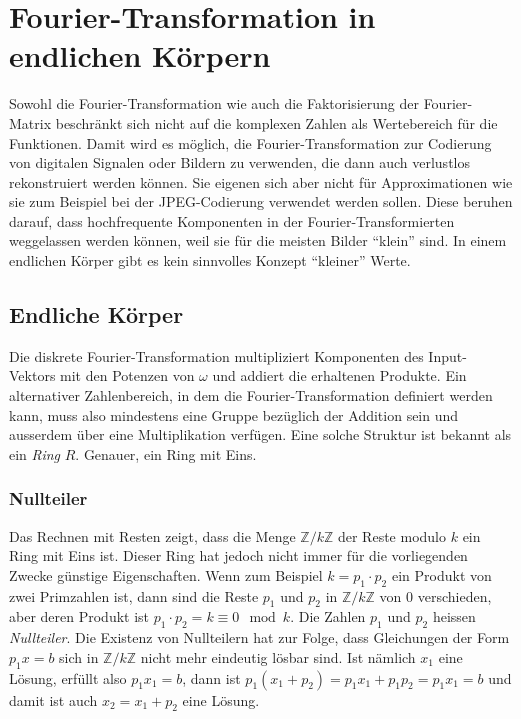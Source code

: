 %
%
%
\section{Fourier-Transformation in endlichen Körpern
\label{buch:diskret:section:koerper}}
Sowohl die Fourier-Transformation wie auch die Faktorisierung
der Fourier-Matrix beschränkt sich nicht auf die komplexen Zahlen
als Wertebereich für die Funktionen.
Damit wird es möglich, die Fourier-Transformation zur Codierung von
digitalen Signalen oder Bildern zu verwenden, die dann auch verlustlos
rekonstruiert werden können.
Sie eigenen sich aber nicht für Approximationen wie sie zum Beispiel
bei der JPEG-Codierung verwendet werden sollen.
Diese beruhen darauf, dass hochfrequente Komponenten in der
Fourier-Transformierten weggelassen werden können, weil sie für die
meisten Bilder ``klein'' sind.
In einem endlichen Körper gibt es kein sinnvolles Konzept ``kleiner''
Werte.

%
%
\subsection{Endliche Körper
\label{buch:diskret:koerper:subsection:koerper}}
Die diskrete Fourier-Transformation multipliziert Komponenten des
Input-Vektors mit den Potenzen von $\omega$ und addiert die erhaltenen
Produkte.
Ein alternativer Zahlenbereich, in dem die Fourier-Transformation
definiert werden kann, muss also mindestens eine Gruppe bezüglich 
der Addition sein und ausserdem über eine Multiplikation verfügen.
Eine solche Struktur ist bekannt als ein {\em Ring} $R$.
Genauer, ein Ring mit Eins.

%
%
\subsubsection{Nullteiler}
Das Rechnen mit Resten zeigt, dass die Menge $\mathbb{Z}/k\mathbb{Z}$
der Reste modulo $k$ ein Ring mit Eins ist.
Dieser Ring hat jedoch nicht immer für die vorliegenden Zwecke günstige
Eigenschaften.
Wenn zum Beispiel $k=p_1\cdot p_2$ ein Produkt von zwei Primzahlen
ist, dann sind die Reste $p_1$ und $p_2$ in $\mathbb{Z}/k\mathbb{Z}$
von $0$ verschieden, aber deren Produkt ist
$p_1\cdot p_2 = k \equiv 0 \mod k$.
Die Zahlen $p_1$ und $p_2$ heissen {\em Nullteiler}.
Die Existenz von Nullteilern hat zur Folge, dass Gleichungen der
Form $p_1 x=b$ sich in $\mathbb{Z}/k\mathbb{Z}$ nicht mehr
eindeutig lösbar sind.
Ist nämlich $x_1$ eine Lösung, erfüllt also $p_1x_1=b$, dann ist
$p_1(x_1+p_2)=p_1x_1+p_1p_2=p_1x_1=b$ und damit ist auch $x_2=x_1+p_2$ 
eine Lösung.

